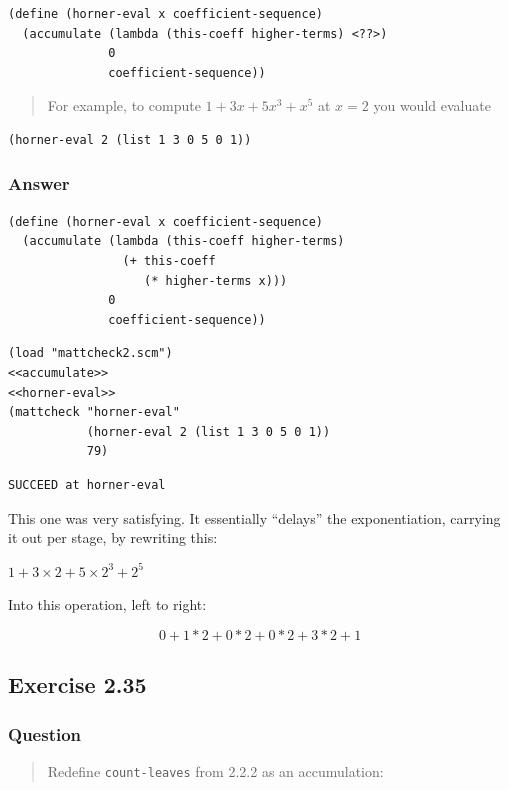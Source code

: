 \documentclass[final,fleqn,titlepage,twoside]{article}
\begin{document}
\begin{verbatim}
(define (horner-eval x coefficient-sequence)
  (accumulate (lambda (this-coeff higher-terms) <??>)
              0
              coefficient-sequence))
\end{verbatim}

\begin{quote}
For example, to compute \(1 + 3x + 5x^3 + x^5\) at \(x = 2\) you
would evaluate
\end{quote}

\begin{verbatim}
(horner-eval 2 (list 1 3 0 5 0 1))
\end{verbatim}

\subsubsection{Answer}
\label{sec:org1e515b3}
\begin{verbatim}
(define (horner-eval x coefficient-sequence)
  (accumulate (lambda (this-coeff higher-terms)
                (+ this-coeff
                   (* higher-terms x)))
              0
              coefficient-sequence))
\end{verbatim}
\begin{verbatim}
(load "mattcheck2.scm")
<<accumulate>>
<<horner-eval>>
(mattcheck "horner-eval"
           (horner-eval 2 (list 1 3 0 5 0 1))
           79)
\end{verbatim}

\begin{verbatim}
SUCCEED at horner-eval
\end{verbatim}

This one was very satisfying. It essentially ``delays'' the exponentiation, carrying it out per stage, by rewriting this:

\(1 + 3 \times 2 + 5 \times 2^3 + 2^5\)

Into this operation, left to right:

\[ 0+1*2+0*2+0*2+3*2+1 \]


\subsection{Exercise 2.35}
\label{sec:orga5f328f}
\subsubsection{Question}
\label{sec:org04569c7}
\begin{quote}
Redefine \texttt{count-leaves} from
2.2.2 as an accumulation:
\end{quote}
\end{document}
